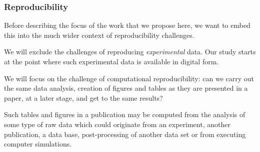 %
%
%
%
%
%
%
%

\medskip

\subsubsection{Reproducibility}\label{sec:concept}\label{sec:reproducibility}

Before describing the focus of the work that we propose here, we want to embed
this into the much wider context of reproducibility challenges.

We will exclude the challenges of reproducing \emph{experimental} data. Our
study starts at the point where such experimental data is available in digital
form.

We will focus on the challenge of computational reproducibility: can we carry out
the same data analysis, creation of figures and tables as they are presented in
a paper, at a later stage, and get to the same results?

Such tables and figures in a publication may be computed from the analysis of
some type of raw data which could originate from an experiment, another publication,
a data base, post-processing of another data set or from executing computer
simulations.

